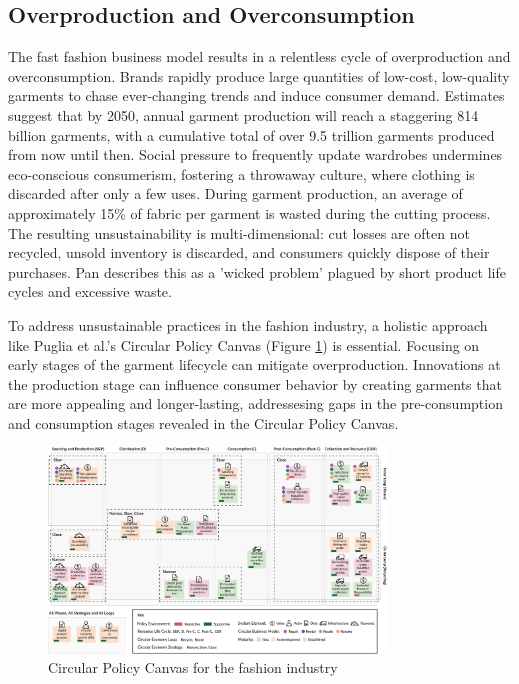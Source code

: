 \subsection{Overproduction and Overconsumption}
The fast fashion business model results in a relentless cycle of overproduction and overconsumption. Brands rapidly produce large quantities of low-cost, low-quality garments to chase ever-changing trends and induce consumer demand. Estimates suggest that by 2050, annual garment production will reach a staggering 814 billion garments, with a cumulative total of over 9.5 trillion garments produced from now until then. Social pressure to frequently update wardrobes undermines eco-conscious consumerism, fostering a throwaway culture, where clothing is discarded after only a few uses. During garment production, an average of approximately 15\% of fabric per garment is wasted during the cutting process. The resulting unsustainability is multi-dimensional: cut losses are often not recycled, unsold inventory is discarded, and consumers quickly dispose of their purchases. Pan describes this as a 'wicked problem' plagued by short product life cycles and excessive waste.

\vspace{\baselineskip}
To address unsustainable practices in the fashion industry, a holistic approach like Puglia et al.'s Circular Policy Canvas (Figure \ref{fig:circular_policy_canvas}) is essential. Focusing on early stages of the garment lifecycle can mitigate overproduction. Innovations at the production stage can influence consumer behavior by creating garments that are more appealing and longer-lasting, addressesing gaps in the pre-consumption and consumption stages revealed in the Circular Policy Canvas.
\begin{figure} [H]
    \centering
    \includegraphics[width=0.8\textwidth]{Images/circular policy canvas.png}
    \caption{Circular Policy Canvas for the fashion industry \cite{}}
    \label{fig:circular_policy_canvas}
\end{figure}


